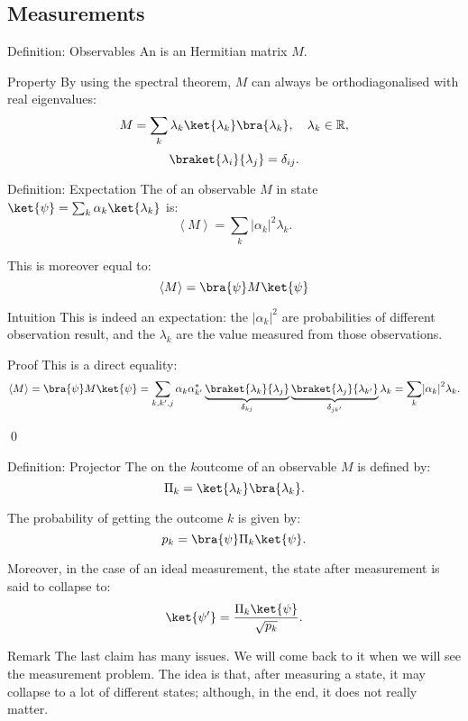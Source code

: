 \documentclass[a4paper]{article}
\begin{document}
\subsection{Measurements}

\begin{parag}{Definition: Observables}
    An  is an Hermitian matrix $M$.

    \begin{subparag}{Property}
        By using the spectral theorem, $M$ can always be orthodiagonalised with real eigenvalues: 
        \[M = \sum_{k} \lambda_k \ket{\lambda_k} \bra{\lambda_k}, \mathspace \lambda_k \in \mathbb{R},\]
        \[\braket{\lambda_i}{\lambda_j} = \delta_{ij}.\]
    \end{subparag}
\end{parag}

\begin{parag}{Definition: Expectation}
    The  of an observable $M$ in state $\ket{\psi} = \sum_{k} \alpha_k \ket{\lambda_k}$ is: 
    \[\left\langle M \right\rangle = \sum_{k} \left|\alpha_k\right|^2 \lambda_k.\]

    This is moreover equal to: 
    \[\left\langle M \right\rangle = \bra{\psi}M \ket{\psi}\]

    \begin{subparag}{Intuition}
        This is indeed an expectation: the $\left|\alpha_k\right|^2$ are probabilities of different observation result, and the $\lambda_k$ are the value measured from those observations.
    \end{subparag}
    
    \begin{subparag}{Proof}
        This is a direct equality:
        \[\left\langle M \right\rangle = \bra{\psi}M \ket{\psi} = \sum_{k, k', j} \alpha_k \alpha_{k'}^* \underbrace{\braket{\lambda_k}{\lambda_j}}_{\delta_{kj}} \underbrace{\braket{\lambda_j}{\lambda_{k'}}}_{\delta_{j k'}}\lambda_k = \sum_{k} \left|\alpha_k\right|^2 \lambda_k.\]

        \qed
    \end{subparag}
\end{parag}

\begin{parag}{Definition: Projector}
    The  on the $k$\Th outcome of an observable $M$ is defined by: 
    \[\Pi_k = \ket{\lambda_k}\bra{\lambda_k}.\]

    The probability of getting the outcome $k$ is given by: 
    \[p_k = \bra{\psi} \Pi_k \ket{\psi}.\]

    Moreover, in the case of an ideal measurement, the state after measurement is said to collapse to: 
    \[\ket{\psi'} = \frac{\Pi_k \ket{\psi}}{\sqrt{p_k}}.\]

    \begin{subparag}{Remark}
        The last claim has many issues. We will come back to it when we will see the measurement problem. The idea is that, after measuring a state, it may collapse to a lot of different states; although, in the end, it does not really matter.
    \end{subparag}
\end{parag}
\end{document}
